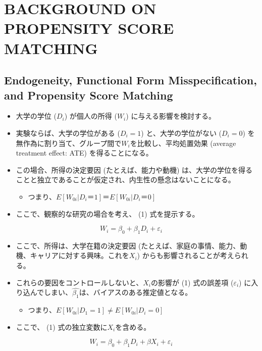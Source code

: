 \section{BACKGROUND ON PROPENSITY SCORE MATCHING}

\subsection*{Endogeneity, Functional Form Misspecification, and Propensity Score Matching}

\begin{itemize}
 \item 大学の学位 ($D_i$) が個人の所得 ($W_i$) に与える影響を検討する。
 \item 実験ならば、大学の学位がある ($D_i=1$) と、大学の学位がない ($D_i=0$) を無作為に割り当て、グループ間で$W_i$を比較し、平均処置効果 (average treatment effect: ATE) を得ることになる。
 \item この場合、所得の決定要因 (たとえば、能力や動機) は、大学の学位を得ることと独立であることが仮定され、内生性の懸念はないことになる。
  \begin{itemize}
   \item つまり、$E[W_{0i} | D_i＝1]＝E[W_{0i} | D_{i}＝0]$
  \end{itemize}
 \item ここで、観察的な研究の場合を考え、 (1) 式を提示する。
\end{itemize}

\begin{equation}
W_i = \beta_0 + \beta_1 D_i + \varepsilon_i
\end{equation}

\begin{itemize}
 \item ここで、所得は、大学在籍の決定要因 (たとえば、家庭の事情、能力、動機、キャリアに対する興味。これを$X_i$) からも影響されることが考えられる。
 \item これらの要因をコントロールしないと、$X_i$の影響が (1) 式の誤差項 ($\varepsilon_i$) に入り込んでしまい、$\hat{\beta_1}$は、バイアスのある推定値となる。
  \begin{itemize}
   \item つまり、$E[W_{0i} | D_1=1] \neq E[W_{0i} | D_i=0]$
  \end{itemize}
 \item ここで、 (1) 式の独立変数に$X_i$を含める。
\end{itemize}

\begin{equation}
W_i = \beta_0 + \beta_1 D_i + \beta X_i + \varepsilon_i
\end{equation}


